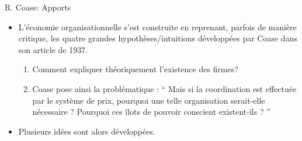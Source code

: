 \begin{frame}[allowframebreaks]{R. Coase: Apports}
    \begin{itemize}
        \item L’économie organisationnelle s’est construite en reprenant,
         parfois de manière critique, les quatre grandes hypothèses/intuitions 
         développées par Coase dans son article de 1937.
         \begin{enumerate}[$\star$]
      \item Comment expliquer théoriquement l’existence des firmes?
      \item Coase pose ainsi la problématique : “ Mais si la coordination est effectuée par le système de prix, pourquoi une telle organisation serait-elle nécessaire ? 
      Pourquoi ces îlots de pouvoir conscient existent-ils ? ”
         \end{enumerate}
         \item Plusieurs idées sont alors développées.


\end{itemize}
\end{frame}
